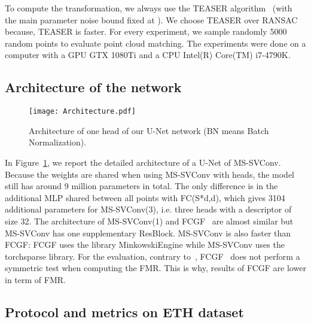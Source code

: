 \documentclass[10pt,twocolumn,letterpaper]{article}
\begin{document}
To compute the transformation, we always use the TEASER algorithm~\cite{yang2020teaser} (with the main parameter noise bound fixed at ). We choose TEASER over RANSAC because, TEASER is faster. 
For every experiment, we sample randomly 5000 random points to evaluate point cloud matching.
The experiments were done on a computer with a GPU GTX 1080Ti and a CPU Intel(R) Core(TM) i7-4790K.


\subsection{Architecture of the network}
\begin{figure}
    \centering
    \texttt{[image: Architecture.pdf]}
    \caption{Architecture of one head of our U-Net network (BN means Batch Normalization). }
    \label{fig:architecture}
\end{figure}

In Figure~\ref{fig:architecture}, we report the detailed architecture of a U-Net of MS-SVConv. Because the weights are shared when using MS-SVConv with  heads, the model still has around 9 million parameters in total. The only difference is in the additional MLP shared between all points with FC(S*d,d), which gives 3104 additional parameters for MS-SVConv(3), i.e. three heads with a descriptor of size 32. The architecture of MS-SVConv(1) and FCGF~\cite{choy2019fully} are almost similar but MS-SVConv has one supplementary ResBlock. MS-SVConv is also faster than FCGF: FCGF uses the library MinkowskiEngine while MS-SVConv uses the torchsparse library. For the evaluation, contrary to~\cite{bai2020d3feat, Poiesi2021, gojcic2018perfect, ao2020SpinNet}, FCGF~\cite{choy2019fully} does not perform a symmetric test when computing the FMR. This is why, results of FCGF are lower in term of FMR. 

\subsection{Protocol and metrics on ETH dataset}
\end{document}
